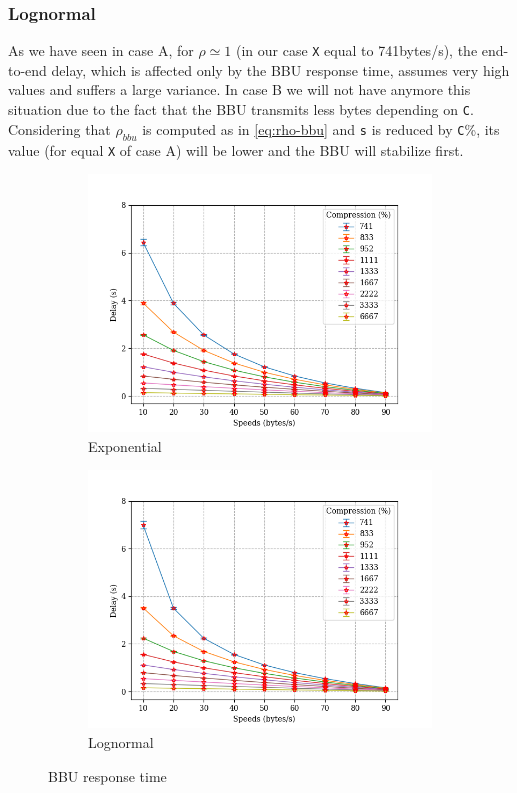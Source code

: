 \documentclass[11pt,a4paper,oneside, openright]{article}
\begin{document}
\subsubsection{Lognormal}
As we have seen in case A, for $\rho \simeq 1$ (in our case \texttt{X} equal to 741bytes/s), the end-to-end delay, which is affected only by the BBU response time, assumes very high values and suffers a large variance. In case B we will not have anymore this situation due to the fact that the BBU transmits less bytes depending on \texttt{C}. Considering that $\rho_{bbu}$ is computed as in \ref{eq:rho-bbu} and \texttt{s} is reduced by \texttt{C}\%, its value (for equal \texttt{X} of case A) will be lower and the BBU will stabilize first.
\begin{figure}[h]
	\centering
	\begin{subfigure}{.5\textwidth}
		\centering
		\includegraphics[width=\linewidth]{images/bbu-exp}
		\caption{Exponential}
		\label{fig:exponential-bbu-response}
	\end{subfigure}%
	\begin{subfigure}{.5\textwidth}
		\centering
		\includegraphics[width=\linewidth]{images/bbu-logn}
		\caption{Lognormal}
		\label{fig:lognormal-bbu-response}
	\end{subfigure}
	\caption{BBU response time}
	\label{fig:bbu-response}
\end{figure}
\end{document}
